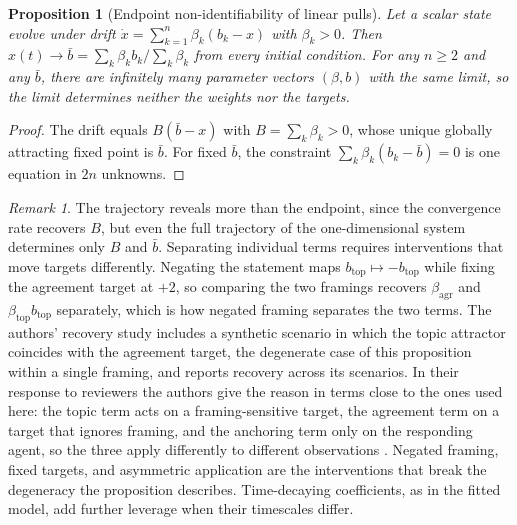 \documentclass[11pt]{article}
\newtheorem{proposition}{Proposition}
\theoremstyle{definition}
\theoremstyle{remark}
\newtheorem*{remark}{Remark}
\begin{document}
\begin{proposition}[Endpoint non-identifiability of linear pulls]\label{prop:centroid}
Let a scalar state evolve under drift $\dot{x} = \sum_{k=1}^{n} \beta_k (b_k - x)$ with $\beta_k > 0$. Then $x(t) \to \bar{b} = \sum_k \beta_k b_k / \sum_k \beta_k$ from every initial condition. For any $n \geq 2$ and any $\bar{b}$, there are infinitely many parameter vectors $(\beta, b)$ with the same limit, so the limit determines neither the weights nor the targets.
\end{proposition}
\begin{proof}
The drift equals $B(\bar{b} - x)$ with $B = \sum_k \beta_k > 0$, whose unique globally attracting fixed point is $\bar{b}$. For fixed $\bar{b}$, the constraint $\sum_k \beta_k (b_k - \bar{b}) = 0$ is one equation in $2n$ unknowns.
\end{proof}
\begin{remark}
The trajectory reveals more than the endpoint, since the convergence rate recovers $B$, but even the full trajectory of the one-dimensional system determines only $B$ and $\bar{b}$. Separating individual terms requires interventions that move targets differently. Negating the statement maps $b_{\mathrm{top}} \mapsto -b_{\mathrm{top}}$ while fixing the agreement target at $+2$, so comparing the two framings recovers $\beta_{\mathrm{agr}}$ and $\beta_{\mathrm{top}} b_{\mathrm{top}}$ separately, which is how negated framing separates the two terms. The authors' recovery study includes a synthetic scenario in which the topic attractor coincides with the agreement target, the degenerate case of this proposition within a single framing, and reports recovery across its scenarios. In their response to reviewers the authors give the reason in terms close to the ones used here: the topic term acts on a framing-sensitive target, the agreement term on a target that ignores framing, and the anchoring term only on the responding agent, so the three apply differently to different observations \cite{brockers2026peer}. Negated framing, fixed targets, and asymmetric application are the interventions that break the degeneracy the proposition describes. Time-decaying coefficients, as in the fitted model, add further leverage when their timescales differ.
\end{remark}
\end{document}
